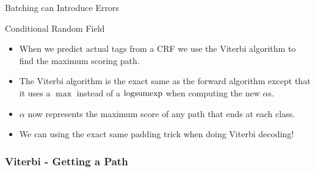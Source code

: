 \documentclass{beamer}
\newcommand{\logsumexp}{\mathop{\rm logsumexp}}
\begin{document}
\begin{section}{Batching can Introduce Errors}
\begin{subsection}{Conditional Random Field}
\begin{frame}
            \begin{itemize}
                \item When we predict actual tags from a CRF we use the Viterbi algorithm to find the maximum scoring
                    path.
                \item The Viterbi algorithm is the exact same as the forward algorithm except that it uses a $\max$ instead of a
                    $\logsumexp$ when computing the new $\alpha$s.
                \item $\alpha$ now represents the maximum score of any path that ends at each class.
                \item We can using the exact same padding trick when doing Viterbi decoding!
            \end{itemize}
        \end{frame}

        \begin{frame}
            \frametitle{Viterbi - Getting a Path}


\end{frame}
\end{subsection}
\end{section}
\end{document}

